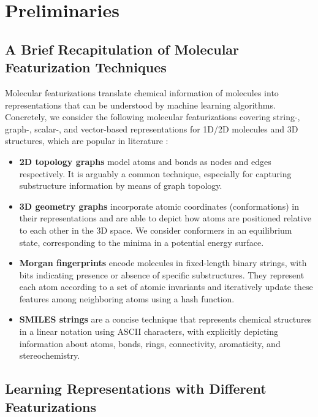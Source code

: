 \section{Preliminaries}

\subsection{A Brief Recapitulation of Molecular Featurization Techniques}
\label{sec:featurization-recap}

Molecular featurizations translate chemical information of molecules into representations that can be understood by machine learning algorithms.
Concretely, we consider the following molecular featurizations covering string-, graph-, scalar-, and vector-based representations for 1D/2D molecules and 3D structures, which are popular in literature \cite{Ramsundar:2019dl,Atz:2021hj}:
\begin{itemize}
	\item \textbf{2D topology graphs} model atoms and bonds as nodes and edges respectively. It is arguably a common technique, especially for capturing substructure information by means of graph topology.

	\item \textbf{3D geometry graphs} incorporate atomic coordinates (conformations) in their representations and are able to depict how atoms are positioned relative to each other in the 3D space. We consider conformers in an equilibrium state, corresponding to the minima in a potential energy surface.
	
	\item \textbf{Morgan fingerprints} \cite{Morgan:1965tg,Glem:2006cf} encode molecules in fixed-length binary strings, with bits indicating presence or absence of specific substructures.
	They represent each atom according to a set of atomic invariants and iteratively update these features among neighboring atoms using a hash function.
	
	\item \textbf{SMILES strings} are a concise technique that represents chemical structures in a linear notation using ASCII characters, with explicitly depicting information about atoms, bonds, rings, connectivity, aromaticity, and stereochemistry.
\end{itemize}

\subsection{Learning Representations with Different Featurizations}


